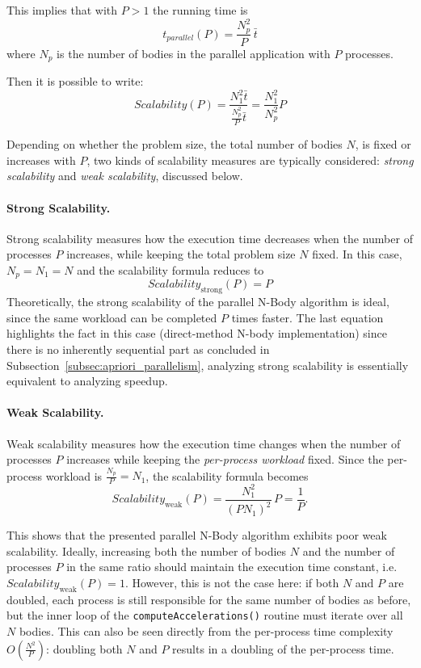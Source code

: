 \documentclass{article}
\begin{document}
This implies that with $P>1$ the running time is
\begin{equation}
t_{{parallel}}(P) = \frac{N_p^2}{P} \, \bar{t}
\end{equation}
where $N_p$ is the number of bodies in the parallel application with $P$ processes.

Then it is possible to write:
\begin{equation}
Scalability(P) = \frac{N^2_1\bar{t}}{\frac{N_p^2}{P}\bar{t}} = \frac{N_1^2}{N_p^2}P
\end{equation}

Depending on whether the problem size, the total number of bodies $N$, is fixed or increases with $P$, two kinds of scalability measures are typically considered: \emph{strong scalability} and \emph{weak scalability}, discussed below.

\paragraph{Strong Scalability.}
Strong scalability measures how the execution time decreases when the number of processes $P$ increases, while keeping the total problem size $N$ fixed.  
In this case, $N_p = N_1 = N$ and the scalability formula reduces to
\[
Scalability_{\text{strong}}(P) = P
\]
Theoretically, the strong scalability of the parallel N-Body algorithm is ideal, since the same workload can be completed $P$ times faster.
The last equation highlights the fact in this case (direct-method N-body implementation) since there is no inherently sequential part as concluded in Subsection~\ref{subsec:apriori_parallelism}, analyzing strong scalability is essentially equivalent to analyzing speedup.

\paragraph{Weak Scalability.}
Weak scalability measures how the execution time changes when the number of processes $P$ increases while keeping the \emph{per-process workload} fixed.  
Since the per-process workload is $\tfrac{N_p}{P} = N_1$, the scalability formula becomes
\[
Scalability_{\text{weak}}(P) = \frac{N_1^2}{(P N_1)^2} \, P = \frac{1}{P}.
\]

This shows that the presented parallel N-Body algorithm exhibits poor weak scalability.  
Ideally, increasing both the number of bodies $N$ and the number of processes $P$ in the same ratio should maintain the execution time constant, i.e.\ $Scalability_{\text{weak}}(P) = 1$.  
However, this is not the case here: if both $N$ and $P$ are doubled, each process is still responsible for the same number of bodies as before, but the inner loop of the \texttt{compute\discretionary{}{}{}Accelerations()} routine must iterate over all $N$ bodies.  
This can also be seen directly from the per-process time complexity $O\!\left(\tfrac{N^2}{P}\right)$: doubling both $N$ and $P$ results in a doubling of the per-process time.
\end{document}
